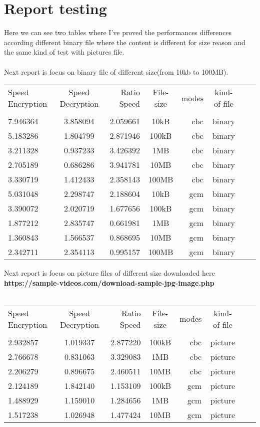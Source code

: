 \documentclass[11pt,a4paper]{article}
\begin{document}
 \section{Report testing}
 Here we can see two tables where I've proved the performances differences according different binary file where the content is different for size reason and the same kind of test with pictures file.\\\\
 

Next report is focus on binary file of different size(from 10kb to 100MB).

\begin{tabular}{l*{3}{cr}r}
\hline

Speed Encryption & Speed Decryption &Ratio Speed & File-size & modes & kind-of-file\\\\
\hline

7.946364	&3.858094	&2.059661	 &10kB &cbc&binary\\
5.183286	&1.804799	&2.871946	 &100kB &cbc&binary\\
3.211328	&0.937233	&3.426392	 &1MB &cbc&binary\\
2.705189	&0.686286	&3.941781	 &10MB &cbc&binary\\
3.330719	&1.412433	&2.358143	 &100MB &cbc&binary\\ 
    \hline
    
5.031048	&2.298747	&2.188604 &10kB &gcm&binary\\
3.390072	&2.020719	&1.677656 &100kB &gcm&binary\\
1.877212	&2.835747	&0.661981 &1MB &gcm&binary\\
1.360843	&1.566537	&0.868695 &10MB &gcm&binary\\
2.342711	&2.354113	&0.995157 &100MB &gcm&binary\\
\hline
\end{tabular}

 \newpage
Next report is focus on picture files of different size downloaded here \textbf{https://sample-videos.com/download-sample-jpg-image.php} 
\newline
\\\\ 
\begin{tabular}{l*{3}{cr}r}
\hline

Speed Encryption & Speed Decryption &Ratio Speed & File-size & modes & kind-of-file\\\\
\hline

 2.932857	&1.019337	&2.877220	 &100kB &cbc&picture\\
 2.766678	&0.831063	&3.329083	 &1MB &cbc&picture\\
 2.206279	&0.896675	&2.460511	 &10MB &cbc&picture\\
    \hline
    
2.124189	&1.842140	&1.153109 &100kB &gcm&picture\\
1.488929	&1.159010	&1.284656 &1MB &gcm&picture\\
1.517238	&1.026948	&1.477424 &10MB &gcm&picture\\
\hline
\end{tabular}
 
\end{document}
